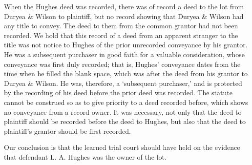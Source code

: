 When the Hughes deed was recorded, there was of record a deed to the lot from
Duryea \& Wilson to plaintiff, but no record showing that Duryea \& Wilson had
any title to convey. The deed to them from the common grantor had not been
recorded. We hold that this record of a deed from an apparent stranger to the
title was not notice to Hughes of the prior unrecorded conveyance by his
grantor. He was a subsequent purchaser in good faith for a valuable
consideration, whose conveyance was first duly recorded; that is, Hughes'
conveyance dates from the time when he filled the blank space, which was after
the deed from his grantor to Duryea \& Wilson. He was, therefore, a `subsequent
purchaser,' and is protected by the recording of his deed before the prior deed
was recorded. The statute cannot be construed so as to give priority to a deed
recorded before, which shows no conveyance from a record owner. It was
necessary, not only that the deed to plaintiff should be recorded before the
deed to Hughes, but also that the deed to plaintiff's grantor should be first
recorded. 

Our conclusion is that the learned trial court should have held on the evidence
that defendant L. A. Hughes was the owner of the lot.



